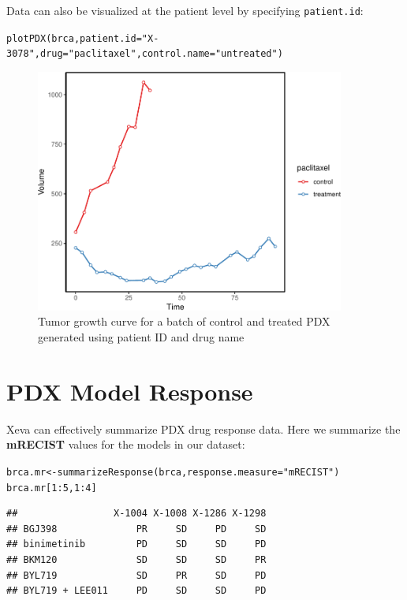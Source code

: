 \documentclass{article}\usepackage[]{graphicx}\usepackage[usenames,dvipsnames]{color}
\newcommand{\hlnum}[1]{\textcolor[rgb]{0.816,0.125,0.439}{#1}}%
\newcommand{\hlstr}[1]{\textcolor[rgb]{0.251,0.627,0.251}{#1}}%
\newcommand{\hlopt}[1]{\textcolor[rgb]{0,0,0}{#1}}%
\newcommand{\hlstd}[1]{\textcolor[rgb]{0.251,0.251,0.251}{#1}}%
\newcommand{\hlkwb}[1]{\textcolor[rgb]{0,0,0}{#1}}%
\newcommand{\hlkwc}[1]{\textcolor[rgb]{0.251,0.251,0.251}{#1}}%
\newcommand{\hlkwd}[1]{\textcolor[rgb]{0.878,0.439,0.125}{#1}}%
\newenvironment{knitrout}{}{} %
\begin{document}
Data can also be visualized at the patient level by specifying \texttt{patient.id}:
\begin{knitrout}
\color{fgcolor}\begin{kframe}
\begin{alltt}
\hlkwd{plotPDX}\hlstd{(brca,} \hlkwc{patient.id}\hlstd{=}\hlstr{"X-3078"}\hlstd{,} \hlkwc{drug}\hlstd{=}\hlstr{"paclitaxel"}\hlstd{,}\hlkwc{control.name} \hlstd{=} \hlstr{"untreated"}\hlstd{)}
\end{alltt}
\end{kframe}\begin{figure}
\includegraphics[width=4in]{figure/pdxplot3-1} \caption{Tumor growth curve for a batch of control and treated PDX generated using patient ID and drug name}\label{fig:pdxplot3}
\end{figure}

\end{knitrout}


\section{PDX Model Response}
Xeva can effectively summarize PDX drug response data. Here we summarize the \textbf{mRECIST} values for the models in our dataset:

\begin{knitrout}
\color{fgcolor}\begin{kframe}
\begin{alltt}
\hlstd{brca.mr} \hlkwb{<-} \hlkwd{summarizeResponse}\hlstd{(brca,} \hlkwc{response.measure} \hlstd{=} \hlstr{"mRECIST"}\hlstd{)}
\hlstd{brca.mr[}\hlnum{1}\hlopt{:}\hlnum{5}\hlstd{,} \hlnum{1}\hlopt{:}\hlnum{4}\hlstd{]}
\end{alltt}
\begin{verbatim}
##                 X-1004 X-1008 X-1286 X-1298
## BGJ398              PR     SD     PD     SD
## binimetinib         PD     SD     SD     PD
## BKM120              SD     SD     SD     PR
## BYL719              SD     PR     SD     PD
## BYL719 + LEE011     PD     SD     SD     PD
\end{verbatim}
\end{kframe}
\end{knitrout}
\end{document}
